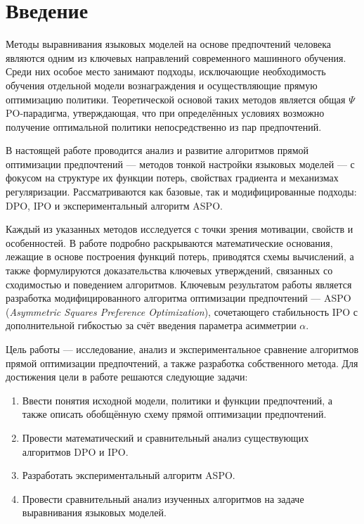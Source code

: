 \documentclass[a4paper,12pt]{article}
\begin{document}
\tableofcontents

\section{Введение}

Методы выравнивания языковых моделей на основе предпочтений человека являются одним из ключевых направлений современного машинного обучения. Среди них особое место занимают подходы, исключающие необходимость обучения отдельной модели вознаграждения и осуществляющие прямую оптимизацию политики. Теоретической основой таких методов является общая $\Psi$PO-парадигма, утверждающая, что при определённых условиях возможно получение оптимальной политики непосредственно из пар предпочтений.

В настоящей работе проводится анализ и развитие алгоритмов прямой оптимизации предпочтений — методов тонкой настройки языковых моделей — с фокусом на структуре их функции потерь, свойствах градиента и механизмах регуляризации. Рассматриваются как базовые, так и модифицированные подходы: DPO, IPO и экспериментальный алгоритм ASPO.

Каждый из указанных методов исследуется с точки зрения мотивации, свойств и особенностей. В работе подробно раскрываются математические основания, лежащие в основе построения функций потерь, приводятся схемы вычислений, а также формулируются доказательства ключевых утверждений, связанных со сходимостью и поведением алгоритмов. Ключевым результатом работы является разработка модифицированного алгоритма оптимизации предпочтений — ASPO (\textit{Asymmetric Squares Preference Optimization}), сочетающего стабильность IPO с дополнительной гибкостью за счёт введения параметра асимметрии $\alpha$.

Цель работы — исследование, анализ и экспериментальное сравнение алгоритмов прямой оптимизации предпочтений, а также разработка собственного метода. Для достижения цели в работе решаются следующие задачи:

\begin{enumerate}
    \item Ввести понятия исходной модели, политики и функции предпочтений, а также описать обобщённую схему прямой оптимизации предпочтений.
    \item Провести математический и сравнительный анализ существующих алгоритмов DPO и IPO.
    \item Разработать экспериментальный алгоритм ASPO.
    \item Провести сравнительный анализ изученных алгоритмов на задаче выравнивания языковых моделей.
\end{enumerate}
\end{document}
